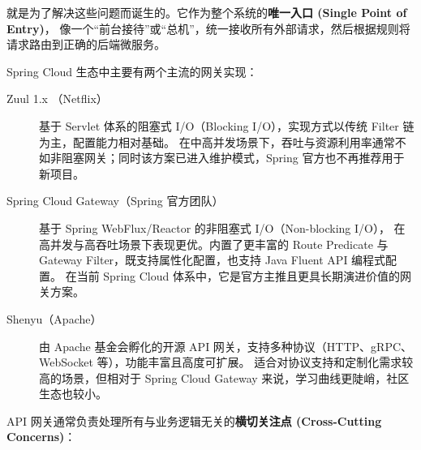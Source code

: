 就是为了解决这些问题而诞生的。它作为整个系统的\textbf{唯一入口 (Single Point of Entry)}，
像一个``前台接待''或``总机''，统一接收所有外部请求，然后根据规则将请求路由到正确的后端微服务。


Spring Cloud 生态中主要有两个主流的网关实现：

\begin{description}
    \item[Zuul 1.x （Netflix）] 基于 Servlet 体系的阻塞式 I/O（Blocking I/O），实现方式以传统 Filter 链为主，配置能力相对基础。
        在中高并发场景下，吞吐与资源利用率通常不如非阻塞网关；同时该方案已进入维护模式，Spring 官方也不再推荐用于新项目。

    \item[Spring Cloud Gateway（Spring 官方团队）] 基于 Spring WebFlux/Reactor 的非阻塞式 I/O（Non-blocking I/O），
        在高并发与高吞吐场景下表现更优。内置了更丰富的 Route Predicate 与 Gateway Filter，既支持属性化配置，也支持 Java Fluent API 编程式配置。
        在当前 Spring Cloud 体系中，它是官方主推且更具长期演进价值的网关方案。

    \item[Shenyu（Apache）] 由 Apache 基金会孵化的开源 API 网关，支持多种协议（HTTP、gRPC、WebSocket 等），功能丰富且高度可扩展。
        适合对协议支持和定制化需求较高的场景，但相对于 Spring Cloud Gateway 来说，学习曲线更陡峭，社区生态也较小。
\end{description}



API 网关通常负责处理所有与业务逻辑无关的\textbf{横切关注点 (Cross-Cutting Concerns)}：

